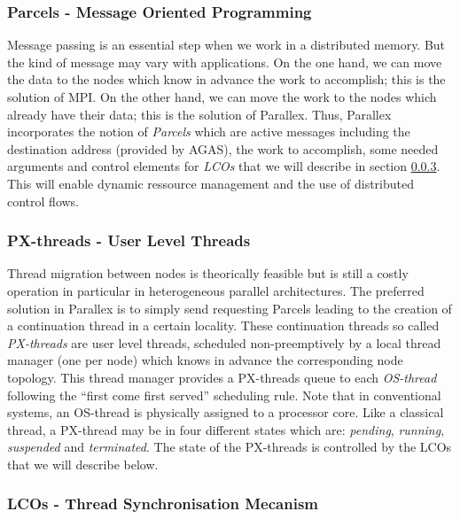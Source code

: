 \documentclass{llncs}
\begin{document}
\subsubsection{Parcels - Message Oriented Programming}
Message passing is an essential step when we work in a distributed memory. But the kind of message may vary with applications. On the one hand, we can move the data to the nodes which know in advance the work to accomplish; this is the solution of MPI. On the other hand, we can move the work to the nodes which already have their data; this is the solution of Parallex. Thus, Parallex incorporates the notion of \emph{Parcels} \cite{Parallex} which are active messages including the destination address (provided by AGAS), the work to accomplish, some needed arguments and control elements for \emph{LCOs} that we will describe in section \ref{lcos}. This will enable dynamic ressource management and the use of distributed control flows.

\subsubsection{PX-threads - User Level Threads}
Thread migration between nodes is theorically feasible but is still a costly operation in particular in heterogeneous parallel architectures. The preferred solution in Parallex is to simply send requesting Parcels leading to the creation of a continuation thread in a certain locality. These continuation threads so called \emph{PX-threads} \cite{Parallex} are user level threads, scheduled non-preemptively by a local thread manager (one per node) which knows in advance the corresponding node topology. This thread manager provides a PX-threads queue to each \emph{OS-thread} \cite{Parallex} following the \enquote{first come first served} scheduling rule. Note that in conventional systems, an OS-thread is physically assigned to a processor core. Like a classical thread, a PX-thread may be in four different states which are: \emph{pending}, \emph{running}, \emph{suspended} and \emph{terminated}. The state of the PX-threads is controlled by the LCOs that we will describe below.

\subsubsection{LCOs - Thread Synchronisation Mecanism}\label{lcos}
\end{document}
